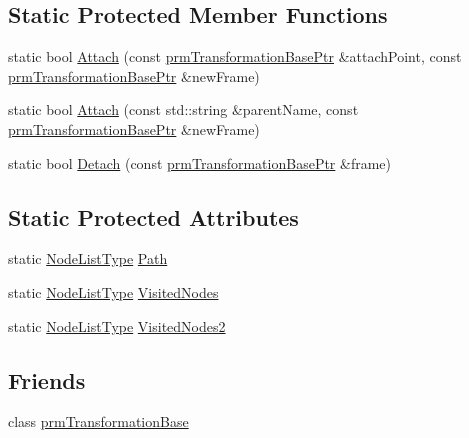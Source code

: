 \subsection*{Static Protected Member Functions}
\begin{DoxyCompactItemize}
\item 
static bool \hyperlink{classprm_transformation_manager_a5fbac7977cdd5b1ba5aa714bdd43ebce}{Attach} (const \hyperlink{prm_transformation_base_8h_a881a6a7d2191474974cdf36d79e1df08}{prm\+Transformation\+Base\+Ptr} \&attach\+Point, const \hyperlink{prm_transformation_base_8h_a881a6a7d2191474974cdf36d79e1df08}{prm\+Transformation\+Base\+Ptr} \&new\+Frame)
\item 
static bool \hyperlink{classprm_transformation_manager_a03378ef2a4bbc167c1f7d0d26e6bde96}{Attach} (const std\+::string \&parent\+Name, const \hyperlink{prm_transformation_base_8h_a881a6a7d2191474974cdf36d79e1df08}{prm\+Transformation\+Base\+Ptr} \&new\+Frame)
\item 
static bool \hyperlink{classprm_transformation_manager_a29d8204269b23e524976ead9b1111375}{Detach} (const \hyperlink{prm_transformation_base_8h_a881a6a7d2191474974cdf36d79e1df08}{prm\+Transformation\+Base\+Ptr} \&frame)
\end{DoxyCompactItemize}
\subsection*{Static Protected Attributes}
\begin{DoxyCompactItemize}
\item 
static \hyperlink{classprm_transformation_manager_a7aaa30d4612656c91c80fc8ee8b96518}{Node\+List\+Type} \hyperlink{classprm_transformation_manager_a5ca4de06a3cb7a5997b754f6f96da737}{Path}
\item 
static \hyperlink{classprm_transformation_manager_a7aaa30d4612656c91c80fc8ee8b96518}{Node\+List\+Type} \hyperlink{classprm_transformation_manager_a5e3fe611cb19ecfdfa5edaea3a7920b0}{Visited\+Nodes}
\item 
static \hyperlink{classprm_transformation_manager_a7aaa30d4612656c91c80fc8ee8b96518}{Node\+List\+Type} \hyperlink{classprm_transformation_manager_a667e73caad0b315c6b0bde485f5fd168}{Visited\+Nodes2}
\end{DoxyCompactItemize}
\subsection*{Friends}
\begin{DoxyCompactItemize}
\item 
class \hyperlink{classprm_transformation_manager_a1414bde07bd6dda93937227241d8b7ee}{prm\+Transformation\+Base}
\end{DoxyCompactItemize}


